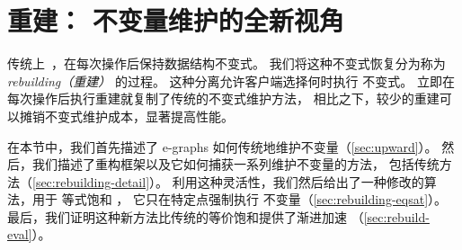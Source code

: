 \section{重建： \Egraph 不变量维护的全新视角}
\label{sec:rebuild}
\label{sec:rebuilding}

传统上~\cite{nelson, simplify}，\egraphs 在每次操作后保持数据结构不变式。
我们将这种不变式恢复分为称为 \textit{rebuilding（重建）} 的过程。
这种分离允许客户端选择何时执行 \egraph 不变式。
立即在每次操作后执行重建就复制了传统的不变式维护方法，
相比之下，较少的重建可以摊销不变式维护成本，显著提高性能。

在本节中，我们首先描述了 e-graphs 如何传统地维护不变量（\autoref{sec:upward}）。
然后，我们描述了重构框架以及它如何捕获一系列维护不变量的方法，
  包括传统方法（\autoref{sec:rebuilding-detail}）。
利用这种灵活性，我们然后给出了一种修改的算法，用于 等式饱和 ，
  它只在特定点强制执行 \egraph 不变量（\autoref{sec:rebuilding-eqsat}）。  %
最后，我们证明这种新方法比传统的等价饱和提供了渐进加速 %
  （\autoref{sec:rebuild-eval}）。



